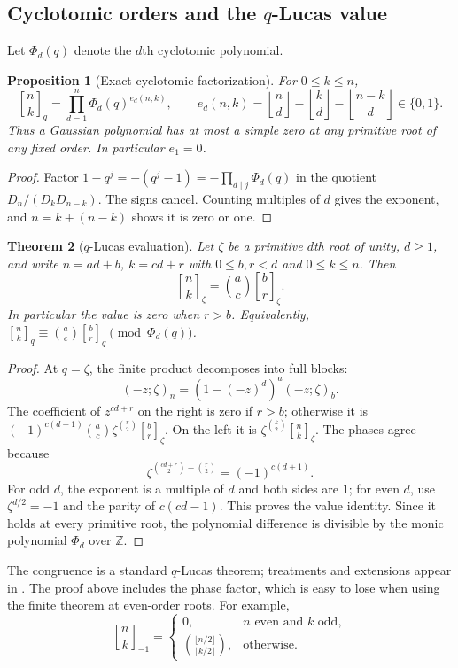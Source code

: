 \documentclass[11pt,a4paper]{article}
\numberwithin{equation}{section}
\newtheorem{theorem}{Theorem}[section]
\newtheorem{proposition}[theorem]{Proposition}
\theoremstyle{definition}
\theoremstyle{remark}
\newcommand{\Z}{\mathbb Z}
\newcommand{\qb}[2]{\genfrac{[}{]}{0pt}{}{#1}{#2}_{q}}
\newcommand{\qbb}[3]{\genfrac{[}{]}{0pt}{}{#1}{#2}_{#3}}
\newcommand{\poch}[3]{(#1;#2)_{#3}}
\begin{document}
\subsection{Cyclotomic orders and the \texorpdfstring{$q$}{q}-Lucas value}
Let $\Phi_d(q)$ denote the $d$th cyclotomic polynomial.
\begin{proposition}[Exact cyclotomic factorization]\label{prop:cyclotomic}
For $0\le k\le n$,
\begin{equation}\label{eq:cyclotomic}
 \qb nk=\prod_{d=1}^n\Phi_d(q)^{e_d(n,k)},\qquad
 e_d(n,k)=\left\lfloor\frac nd\right\rfloor
       -\left\lfloor\frac kd\right\rfloor
       -\left\lfloor\frac{n-k}d\right\rfloor\in\{0,1\}.
\end{equation}
Thus a Gaussian polynomial has at most a simple zero at any primitive root
of any fixed order. In particular $e_1=0$.
\end{proposition}
\begin{proof}
Factor $1-q^j=-(q^j-1)=-\prod_{d\mid j}\Phi_d(q)$ in the quotient
$D_n/(D_kD_{n-k})$. The signs cancel. Counting multiples of $d$ gives the
exponent, and $n=k+(n-k)$ shows it is zero or one.
\end{proof}

\begin{theorem}[$q$-Lucas evaluation]\label{thm:qlucas}
Let $\zeta$ be a primitive $d$th root of unity, $d\ge1$, and write
$n=ad+b$, $k=cd+r$ with $0\le b,r<d$ and $0\le k\le n$. Then
\begin{equation}\label{eq:qlucas}
 \qbb nk\zeta=\binom ac\qbb br\zeta.
\end{equation}
In particular the value is zero when $r>b$. Equivalently,
$\qb nk\equiv\binom ac\qb br\pmod{\Phi_d(q)}$.
\end{theorem}
\begin{proof}
At $q=\zeta$, the finite product decomposes into full blocks:
\[
 \poch{-z}\zeta n=(1-(-z)^d)^a\poch{-z}\zeta b.
\]
The coefficient of $z^{cd+r}$ on the right is zero if $r>b$; otherwise it is
$(-1)^{c(d+1)}\binom ac\zeta^{\binom r2}\qbb br\zeta$.
On the left it is $\zeta^{\binom k2}\qbb nk\zeta$.
The phases agree because
\[
 \zeta^{\binom{cd+r}2-\binom r2}=(-1)^{c(d+1)}.
\]
For odd $d$, the exponent is a multiple of $d$ and both sides are $1$;
for even $d$, use $\zeta^{d/2}=-1$ and the parity of $c(cd-1)$.
This proves the value identity. Since it holds at every primitive root, the
polynomial difference is divisible by the monic polynomial $\Phi_d$ over $\Z$.
\end{proof}
The congruence is a standard $q$-Lucas theorem; treatments and extensions appear
in \cite{HarmanHopkins,FormichellaStraub}. The proof above includes the phase
factor, which is easy to lose when using the finite theorem at even-order roots.
For example,
\begin{equation}\label{eq:minus-one}
 \qbb nk{-1}=
 \begin{cases}
  0,&n\text{ even and }k\text{ odd},\\
  \displaystyle\binom{\lfloor n/2\rfloor}{\lfloor k/2\rfloor},&\text{otherwise}.
 \end{cases}
\end{equation}
\end{document}
